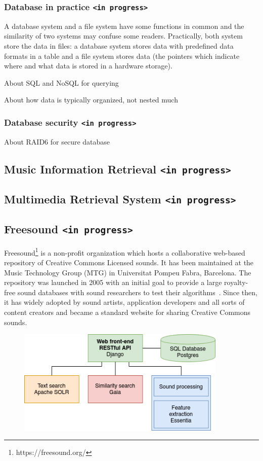 \subsubsection{Database in practice \texttt{<in progress>}}
A database system and a file system have some functions in common and the similarity of two systems may confuse some readers. Practically, both system store the data in files: a database system stores data with predefined data formats in a table and a file system stores data (the pointers which indicate where and what data is stored in a hardware storage).

About SQL and NoSQL for querying

About how data is typically organized, not nested much

\subsubsection{Database security \texttt{<in progress>}}
About RAID6 for secure database

\subsection{Music Information Retrieval \texttt{<in progress>}}


\subsection{Multimedia Retrieval System \texttt{<in progress>}}

\subsection{Freesound \texttt{<in progress>}}
Freesound\footnote{https://freesound.org/} is a non-profit organization which hosts a collaborative web-based repository of Creative Commons Licensed sounds. It has been maintained at the Music Technology Group (MTG) in Universitat Pompeu Fabra, Barcelona. The repository was launched in 2005 with an initial goal to provide a large royalty-free sound databases with sound researchers to test their algorithms~\cite{frederic2013}. Since then, it has widely adopted by sound artists, application developers and all sorts of content creators and became a standard website for sharing Creative Commons sounds.


\begin{figure}[htb]
	\centering
	\includegraphics[width=10cm]{Figures/freesound_api.png}
	\caption{}
	\label{freesound-api}
\end{figure}


